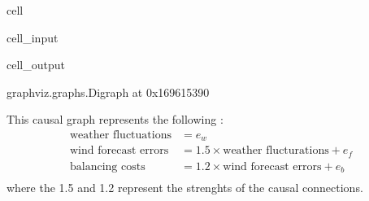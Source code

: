 \documentclass[letterpaper,10pt,english]{jupyterBook}
\begin{document}
\begin{sphinxuseclass}{cell}\begin{sphinxVerbatimInput}

\begin{sphinxuseclass}{cell_input}
\begin{sphinxVerbatim}[commandchars=\\\{\}]
   
   

  \PYG{p}{[}\PYG{p}{[}  \PYG{p}{]}
              \PYG{p}{[}  \PYG{p}{]}
              \PYG{p}{[}  \PYG{p}{]}\PYG{p}{]}

 \PYG{p}{[}  \PYG{p}{]}
\end{sphinxVerbatim}

\end{sphinxuseclass}\end{sphinxVerbatimInput}
\begin{sphinxVerbatimOutput}

\begin{sphinxuseclass}{cell_output}
\begin{sphinxVerbatim}[commandchars=\\\{\}]
\PYGZlt{}graphviz.graphs.Digraph at 0x169615390\PYGZgt{}
\end{sphinxVerbatim}

\end{sphinxuseclass}\end{sphinxVerbatimOutput}

\end{sphinxuseclass}
\sphinxAtStartPar
This causal graph represents the following :
\label{equation:notebooks/basic_dag_structures:acb49524-1909-4f3c-9842-cf64291aa07e}\begin{align}
\text{weather fluctuations} &= e_w \\
\text{wind forecast errors} &= 1.5 \times \text{weather flucturations} + e_f \\
\text{balancing costs} &= 1.2 \times \text{wind forecast errors} + e_b \\
\end{align}
\sphinxAtStartPar
where the  1.5 and 1.2 represent the strenghts of the causal connections.
\end{document}
